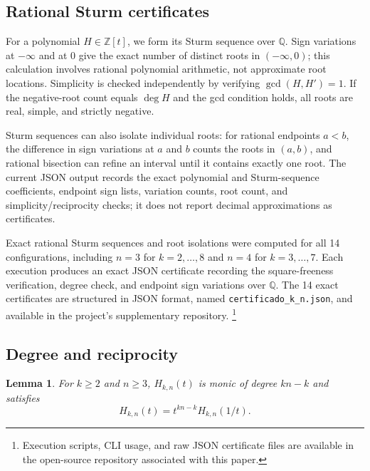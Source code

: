 \documentclass[11pt,a4paper]{article}
\newtheorem{lemma}[theorem]{Lemma}
\theoremstyle{definition}
\begin{document}
\subsection{Rational Sturm certificates}

For a polynomial $H\in\mathbb{Z}[t]$, we form its Sturm sequence over $\mathbb{Q}$. Sign variations at $-\infty$ and at $0$ give the exact number of distinct roots in $(-\infty,0)$; this calculation involves rational polynomial arithmetic, not approximate root locations. Simplicity is checked independently by verifying $\gcd(H,H')=1$. If the negative-root count equals $\deg H$ and the gcd condition holds, all roots are real, simple, and strictly negative.

Sturm sequences can also isolate individual roots: for rational endpoints $a<b$, the difference in sign variations at $a$ and $b$ counts the roots in $(a,b)$, and rational bisection can refine an interval until it contains exactly one root. The current JSON output records the exact polynomial and Sturm-sequence coefficients, endpoint sign lists, variation counts, root count, and simplicity/reciprocity checks; it does not report decimal approximations as certificates.

Exact rational Sturm sequences and root isolations were computed for all
14 configurations, including $n=3$ for $k=2,\ldots,8$ and $n=4$ for
$k=3,\ldots,7$. Each execution produces an exact JSON certificate
recording the square-freeness verification, degree check, and endpoint
sign variations over $\mathbb{Q}$. The 14 exact certificates are
structured in JSON format, named
\texttt{certificado\_k\_n.json}, and available in the project's
supplementary repository.
\footnote{Execution scripts, CLI usage, and raw JSON certificate files are available in the open-source repository associated with this paper.}

\subsection{Degree and reciprocity}\label{sec:structure}

\begin{lemma}\label{lem:structure}
For $k\ge2$ and $n\ge3$, $H_{k,n}(t)$ is monic of degree $kn-k$ and satisfies
\begin{equation}\label{eq:reciprocity}
H_{k,n}(t)=t^{kn-k}H_{k,n}(1/t).
\end{equation}
\end{lemma}
\end{document}
